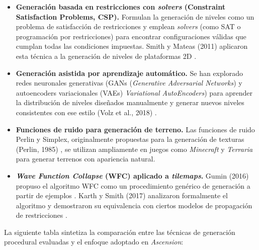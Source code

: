 \begin{itemize}
\item \textbf{Generación basada en restricciones con \textit{solvers} (Constraint Satisfaction Problems, CSP).} Formulan la generación de niveles como un problema de satisfacción de restricciones y emplean \textit{solvers} (como SAT o programación por restricciones) para encontrar configuraciones válidas que cumplan todas las condiciones impuestas. Smith y Mateas (2011) aplicaron esta técnica a la generación de niveles de plataformas 2D \cite{SMITH_MATEAS_2011}.
\item \textbf{Generación asistida por aprendizaje automático.} Se han explorado redes neuronales generativas (GANs (\textit{Generative Adversarial Networks}) y autoencoders variacionales (VAEs) \textit{Variational AutoEncoders}) para aprender la distribución de niveles diseñados manualmente y generar nuevos niveles consistentes con ese estilo (Volz et al., 2018) \cite{VOLZ_2018}.
\item \textbf{Funciones de ruido para generación de terreno.} Las funciones de ruido Perlin y Simplex, originalmente propuestas para la generación de texturas (Perlin, 1985) \cite{PERLIN_1985}, se utilizan ampliamente en juegos como \textit{Minecraft} y \textit{Terraria} para generar terrenos con apariencia natural.
\item \textbf{\textit{Wave Function Collapse} (WFC) aplicado a \textit{tilemaps}.} Gumin (2016) propuso el algoritmo WFC como un procedimiento genérico de generación a partir de ejemplos \cite{GUMIN_WFC_2016}. Karth y Smith (2017) analizaron formalmente el algoritmo y demostraron su equivalencia con ciertos modelos de propagación de restricciones \cite{KARTH_SMITH_2017}.
\end{itemize}

La siguiente tabla sintetiza la comparación entre las técnicas de generación procedural evaluadas y el enfoque adoptado en \textit{Ascension}:

